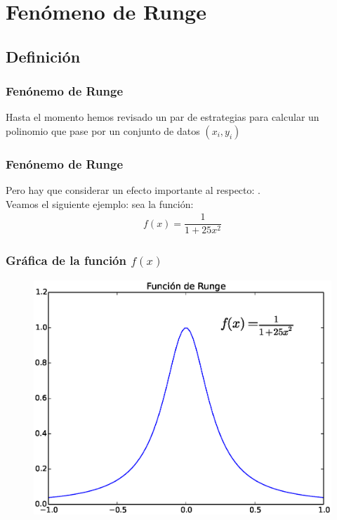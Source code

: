\documentclass[12pt]{beamer}
\begin{document}
\section{Fenómeno de Runge}
\subsection{Definición}

\begin{frame}
\frametitle{Fenónemo de Runge}
Hasta el momento hemos revisado un par de estrategias para calcular un polinomio que pase por un conjunto de datos $(x_{i}, y_{i})$
\end{frame}
\begin{frame}
\frametitle{Fenónemo de Runge}
Pero hay que considerar un efecto importante al respecto: .
\\
\medskip
\pause
Veamos el siguiente ejemplo: sea la función:
\begin{align*}
f (x) = \dfrac{1}{1 + 25 x^{2}}
\end{align*}
\end{frame}
\begin{frame}
\frametitle{Gráfica de la función $f(x)$}
\begin{figure}
	\centering
	\includegraphics[scale=0.47]{Imagenes/Funcion_Runge_01.eps} 
\end{figure}
\end{frame}
\end{document}
